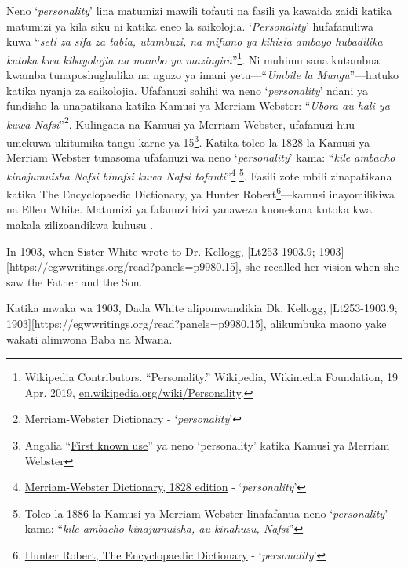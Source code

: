 Neno ‘\textit{personality}’ lina matumizi mawili tofauti na fasili ya kawaida zaidi katika matumizi ya kila siku ni katika eneo la saikolojia. ‘\textit{Personality}’ hufafanuliwa kuwa “\textit{seti za sifa za tabia, utambuzi, na mifumo ya kihisia ambayo hubadilika kutoka kwa kibayolojia na mambo ya mazingira}”\footnote{Wikipedia Contributors. “Personality.” Wikipedia, Wikimedia Foundation, 19 Apr. 2019, \href{https://en.wikipedia.org/wiki/Personality}{en.wikipedia.org/wiki/Personality}.}. Ni muhimu sana kutambua kwamba tunaposhughulika na nguzo ya imani yetu—“\textit{Umbile la Mungu}”—hatuko katika nyanja za saikolojia. Ufafanuzi sahihi wa neno ‘\textit{personality}’ ndani ya fundisho la  unapatikana katika Kamusi ya Merriam-Webster: “\textit{Ubora au hali ya kuwa Nafsi}”\footnote{\href{https://www.merriam-webster.com/dictionary/personality}{Merriam-Webster Dictionary} - ‘\textit{personality}’}. Kulingana na Kamusi ya Merriam-Webster, ufafanuzi huu umekuwa ukitumika tangu karne ya 15\footnote{Angalia “\href{https://www.merriam-webster.com/dictionary/personality\#word-history}{First known use}” ya neno ‘personality’ katika Kamusi ya Merriam Webster}. Katika toleo la 1828 la Kamusi ya Merriam Webster tunasoma ufafanuzi wa neno ‘\textit{personality}’ kama: “\textit{kile ambacho kinajumuisha Nafsi binafsi kuwa Nafsi tofauti}”\footnote{\href{https://archive.org/details/americandictiona02websrich/page/272/mode/2up}{Merriam-Webster Dictionary, 1828 edition} - ‘\textit{personality}’} \footnote{\href{https://archive.org/details/websterscomplete00webs/page/974/mode/2up}{Toleo la 1886 la Kamusi ya Merriam-Webster} linafafanua neno ‘\textit{personality}’ kama: “\textit{kile ambacho kinajumuisha, au kinahusu, Nafsi}”}. Fasili zote mbili zinapatikana katika The Encyclopaedic Dictionary, ya Hunter Robert\footnote{\href{https://babel.hathitrust.org/cgi/pt?id=mdp.39015050663213&view=1up&seq=780}{Hunter Robert, The Encyclopaedic Dictionary} - ‘\textit{personality}’}—kamusi inayomilikiwa na Ellen White. Matumizi ya fafanuzi hizi yanaweza kuonekana kutoka kwa makala zilizoandikwa kuhusu .


In 1903, when Sister White wrote to Dr. Kellogg, [Lt253-1903.9; 1903][https://egwwritings.org/read?panels=p9980.15], she recalled her vision when she saw the Father and the Son.


Katika mwaka wa 1903, Dada White alipomwandikia Dk. Kellogg, [Lt253-1903.9; 1903][https://egwwritings.org/read?panels=p9980.15], alikumbuka maono yake wakati alimwona Baba na Mwana.


